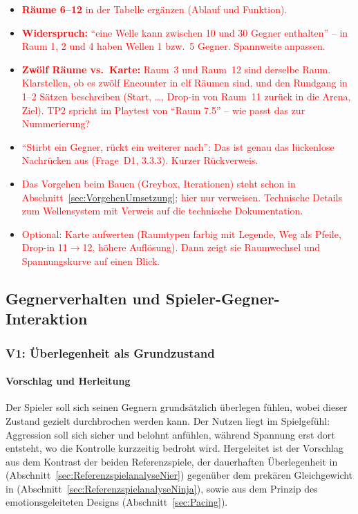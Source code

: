 \documentclass[../Main.tex]{subfiles}
\begin{document}
\begin{itemize}[leftmargin=1.5cm]
    \item \textcolor{red}{\textbf{Räume 6--12} in der Tabelle ergänzen (Ablauf und Funktion).}
    \item \textcolor{red}{\textbf{Widerspruch:} \enquote{eine Welle kann zwischen 10 und 30 Gegner enthalten} -- in Raum 1, 2 und 4 haben Wellen 1 bzw.\ 5 Gegner. Spannweite anpassen.}
    \item \textcolor{red}{\textbf{Zwölf Räume vs.\ Karte:} Raum~3 und Raum~12 sind derselbe Raum. Klarstellen, ob es zwölf Encounter in elf Räumen sind, und den Rundgang in 1--2 Sätzen beschreiben (Start, \ldots, Drop-in von Raum~11 zurück in die Arena, Ziel). TP2 spricht im Playtest von \enquote{Raum 7.5} -- wie passt das zur Nummerierung?}
    \item \textcolor{red}{\enquote{Stirbt ein Gegner, rückt ein weiterer nach}: Das ist genau das lückenlose Nachrücken aus  (Frage~D1, 3.3.3). Kurzer Rückverweis.}
    \item \textcolor{red}{Das Vorgehen beim Bauen (Greybox, Iterationen) steht schon in Abschnitt~\ref{sec:VorgehenUmsetzung}; hier nur verweisen. Technische Details zum Wellensystem mit Verweis auf die technische Dokumentation.}
    \item \textcolor{red}{Optional: Karte aufwerten (Raumtypen farbig mit Legende, Weg als Pfeile, Drop-in 11$\rightarrow$12, höhere Auflösung). Dann zeigt sie Raumwechsel und Spannungskurve auf einen Blick.}
\end{itemize}

\subsection{Gegnerverhalten und Spieler-Gegner-Interaktion} \label{sec:UmsetzungGegner}

\subsubsection{V1: Überlegenheit als Grundzustand} \label{sec:V1}

\paragraph{Vorschlag und Herleitung}
Der Spieler soll sich seinen Gegnern grundsätzlich überlegen fühlen, wobei dieser Zustand gezielt durchbrochen werden kann. Der Nutzen liegt im Spielgefühl: Aggression soll sich sicher und belohnt anfühlen, während Spannung erst dort entsteht, wo die Kontrolle kurzzeitig bedroht wird. Hergeleitet ist der Vorschlag aus dem Kontrast der beiden Referenzspiele, der dauerhaften Überlegenheit in  (Abschnitt~\ref{sec:ReferenzspielanalyseNier}) gegenüber dem prekären Gleichgewicht in  (Abschnitt~\ref{sec:ReferenzspielanalyseNinja}), sowie aus dem Prinzip des emotionsgeleiteten Designs (Abschnitt~\ref{sec:Pacing}).
\end{document}
